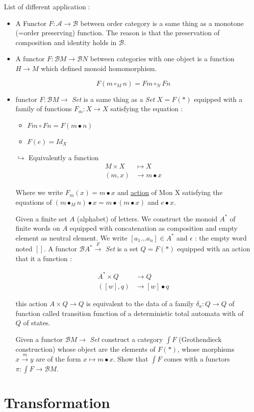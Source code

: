 \documentclass{article}
\theoremstyle{plain}
\begin{document}
  \ex List of different application :
  \begin{itemize}
    \item A Functor $F : \mathcal A \to \mathcal B$ between order category
      is a same thing as a monotone (=order preserving) function. The reason is
      that the preservation of composition and identity holds in $\mathcal B$.
    \item A functor $F : \mathcal B M \to \mathcal B N$ between categories with
      one object is a function $H \to M$ which defined monoid homomorphism.

      $$F(m \circ_M n) = F m \circ_N Fn$$

    \item  functor $F : \mathcal B M \to$ \textit{Set} is a same thing as a
      \textit{Set} $X = F(*)$ equipped with a family of functions $F_m : X \to
      X$ satisfying the equation :
      \begin{itemize}
        \item $F m \circ F n = F (m \bullet n)$
        \item $F(e) = Id_X$
      \end{itemize}
      $\hookrightarrow$ Equivalently a function
      \begin{align*}
        M \times X &\mapsto X \\
        (m, x) &\to m \bullet x
      \end{align*}

      Where we write $F_m(x) = m \bullet x$ and \underline{action} of Mon X
      satisfying the equations of $(m \bullet_M n) \bullet x = m \bullet
      (m \bullet x)$ and $e \bullet x$.

      \ex Given a finite set $A$ (alphabet) of letters. We construct the monoid
      $A^*$ of finite words on $A$  equipped with concatenation as composition
      and empty element as neutral element. We write $[a_1\ldots a_n] \in A^*$
      and $\epsilon$ : the empty word noted $[]$. A functor $\mathcal B A^*
      \xrightarrow{F}$ \textit{Set} is a set $Q = F(*)$ equipped with an action
      that it a function :

      \begin{align*}
        A^* \times Q &\to Q \\
        ([w], q) &\to [w] \bullet q
      \end{align*}

      \remk this action $A \times Q \to Q$ is equivalent to the data of  a
      family $\delta_a : Q \to Q$ of function called transition function of a
      deterministic total automata with  of $Q$ of states.

      \ex Given a functor $\mathcal B M \to$ \textit{Set} construct a category
      $\int F$ (Grothendieck construction) whose object are the elements of
      $F(*)$, whose morphisms $x \xrightarrow{m} y$ are of the form $x \mapsto m
      \bullet x$. Show that $\int F$ comes with a functors $\pi : \int F \to
      \mathcal B M$.
    
    \end{itemize}
  \section{Transformation}
\end{document}
